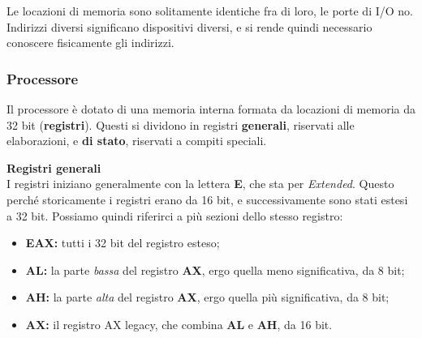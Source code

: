 \documentclass[a4paper,11pt]{article}
\begin{document}
\par\smallskip

Le locazioni di memoria sono solitamente identiche fra di loro, le porte di I/O no.
Indirizzi diversi significano dispositivi diversi, e si rende quindi necessario conoscere fisicamente gli indirizzi.

\subsubsection{Processore}
Il processore è dotato di una memoria interna formata da locazioni di memoria da 32 bit (\textbf{registri}).
Questi si dividono in registri \textbf{generali}, riservati alle elaborazioni, e \textbf{di stato}, riservati a compiti speciali.

\par\medskip
\noindent
\textbf{\textsf{Registri generali}} \\
I registri iniziano generalmente con la lettera \textbf{E}, che sta per \textit{Extended}.
Questo perché storicamente i registri erano da 16 bit, e successivamente sono stati estesi a 32 bit.
Possiamo quindi riferirci a più sezioni dello stesso registro:
\begin{itemize}
	\item \textbf{EAX:} tutti i 32 bit del registro esteso;
	\item \textbf{AL:} la parte \textit{bassa} del registro \textbf{AX}, ergo quella meno significativa, da 8 bit;
	\item \textbf{AH:} la parte \textit{alta} del registro \textbf{AX}, ergo quella più significativa, da 8 bit;
	\item \textbf{AX:} il registro AX legacy, che combina \textbf{AL} e \textbf{AH}, da 16 bit.
 \end{itemize}
\end{document}
